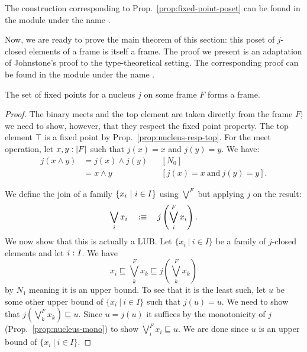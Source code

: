 The \veragda{} construction corresponding to Prop.~\ref{prop:fixed-point-poset} can be
found in the  module under the name .

Now, we are ready to prove the main theorem of this section: this poset of $j$-closed
elements of a frame is itself a frame. The proof we present is an adaptation of
Johnstone's proof \cite[II.2.2, pg.~49]{stone-spaces} to the type-theoretical setting. The
corresponding \veragda{} proof can be found in the  module under the name
.

\begin{thm}\label{thm:fixed-point-frame}
  The set of fixed points for a nucleus $j$ on some frame $F$ forms a frame.
\end{thm}
\begin{proof}
  The binary meets and the top element are taken directly from the frame $F$; we need to
  show, however, that they respect the fixed point property. The top element $\top$ is a
  fixed point by Prop.~\ref{prop:nucleus-resp-top}. For the meet operation, let
  $x, y:\left| F \right|$ such that $j(x) = x$ and $j(y) = y$. We have:
  \begin{align*}
    j(x \wedge y) &= j(x) \wedge j(y) && [N_0] \\
             &= x \wedge y       && [j(x) = x~\text{and}~j(y) = y].
  \end{align*}

  We define the join of a family $\left\{  x_i ~|~ i \in I  \right\}$ using $\bigvee^F$ but applying $j$ on
  the result:
  \begin{equation*}
    \bigvee_i x_i \quad:\equiv\quad j \left( \bigvee^F_i x_i \right).
  \end{equation*}
  We now show that this is actually a LUB. Let $\{ x_i ~|~ i \in I \}$ be a family of
  $j$-closed elements and let $i\hspace{0.1mm}:\hspace{0.1mm}I$. We have
  \begin{equation*}
    x_i \sqsubseteq \bigvee^F_k x_k \sqsubseteq j\left( \bigvee^F_k x_k \right)
  \end{equation*}
  by $N_1$ meaning it is an upper bound. To see that it is the least such, let $u$ be some
  other upper bound of $\{ x_i ~|~ i \in I \}$ such that $j(u) = u$. We need to show that $j
  \left( \bigvee^F_k x_k \right) \sqsubseteq u$. Since $u = j(u)$ it suffices by the monotonicity of $j$
  (Prop.~\ref{prop:nucleus-mono}) to show $\bigvee^F_i x_i \sqsubseteq u$. We are done since $u$ is an
  upper bound of $\{ x_i ~|~ i \in I \}$.


\end{proof}
